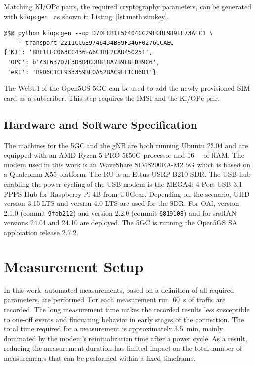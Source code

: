 Matching KI/OPc pairs, the required cryptography parameters, can be generated with
\texttt{kiopcgen}~\cite{kiopcgenerator} as shown in Listing~\ref{lst:meth:simkey}.

\begin{lstfloat}[htb]
\begin{lstlisting}[basicstyle={\ttfamily\small\color{black}},style=base,caption={Generated KI/OPC pairs by usind python kiopcgen.},label={lst:meth:simkey}]
@$@ python kiopcgen --op D7DECB1F50404CC29ECBF989FE73AFC1 \
    --transport 2211CC6E9746434B89F346F0276CCAEC
{'KI': '8BB1FEC063CC436EA6C1BF2CAD450251',
 'OPC': b'A3F637D7F3D3D4CDB818A7B98BEDB9C6',
 'eKI': 'B9D6C1CE933359BE0A52BAC9E81CB6D1'}
\end{lstlisting}
\end{lstfloat}

The WebUI of the Open5GS \gls{5GC} can be used to add the newly provisioned SIM card as a subscriber.
This step requires the \gls{IMSI} and the Ki/OPc pair.


\subsection{Hardware and Software Specification}
The machines for the \gls{5GC} and the \gls{gNB} are both running Ubuntu 22.04 and are equipped with an
AMD Ryzen 5 PRO 5650G processor and \SI{16}{\giga\byte} of RAM.
The modem used in this work is an WaveShare SIM8200EA-M2 5G which is based on a Qualcomm X55 platform.
The \gls{RU} is an Ettus USRP B210 \gls{SDR}.
The USB hub enabling the power cycling of the USB modem is the MEGA4: 4-Port USB 3.1 PPPS Hub for Raspberry Pi 4B from UUGear.
Depending on the scenario, \gls{UHD} version 3.15 LTS and version 4.0 LTS are used for the \gls{SDR}.
For OAI, version 2.1.0 (commit \texttt{9fab212}) and version 2.2.0 (commit \texttt{6819108}) and for
srsRAN versions 24.04 and 24.10 are deployed.
The \gls{5GC} is running the Open5GS \gls{SA} application release 2.7.2.


\section{Measurement Setup}\label{sec:meth:measure}

In this work, automated measurements, based on a definition of all required parameters, are performed.
For each measurement run, \SI{60}{\second} of traffic are recorded.
The long measurement time makes the recorded results less susceptible to one-off events and flucuating
behavior in early stages of the connection.
The total time required for a measurement is approximately \SI{3.5}{\minute}, mainly dominated by the modem's
reinitialization time after a power cycle.
As a result, reducing the measurement duration has limited impact on the total number of measurements
that can be performed within a fixed timeframe.

